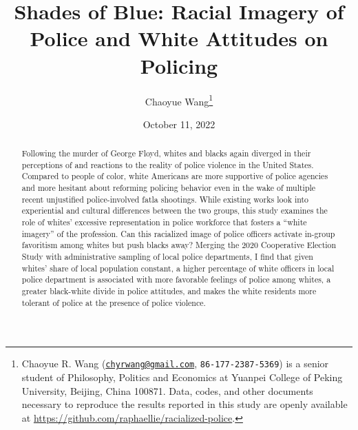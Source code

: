 \documentclass[
  12pt,
]{article}
\title{Shades of Blue: Racial Imagery of Police and White Attitudes on
Policing}
\author{Chaoyue Wang\footnote{Chaoyue R. Wang
  (\href{mailto:chyrwang@gmail.com}{\nolinkurl{chyrwang@gmail.com}},
  \texttt{86-177-2387-5369}) is a senior student of Philosophy, Politics
  and Economics at Yuanpei College of Peking University, Beijing, China
  100871. Data, codes, and other documents necessary to reproduce the
  results reported in this study are openly available at
  \url{https://github.com/raphaellie/racialized-police}.}}
\date{October 11, 2022}
\begin{document}

\maketitle


\thispagestyle{empty}

\begin{abstract}  \onehalfspacing
\begin{normalsize}  \noindent 
Following the murder of George Floyd, whites and blacks again diverged
in their perceptions of and reactions to the reality of police violence
in the United States. Compared to people of color, white Americans are
more supportive of police agencies and more hesitant about reforming
policing behavior even in the wake of multiple recent unjustified
police-involved fatla shootings. While existing works look into
experiential and cultural differences between the two groups, this study
examines the role of whites' excessive representation in police
workforce that fosters a ``white imagery'' of the profession. Can this
racialized image of police officers activate in-group favoritism among
whites but push blacks away? Merging the 2020 Cooperative Election Study
with administrative sampling of local police departments, I find that
given whites' share of local population constant, a higher percentage of
white officers in local police department is associated with more
favorable feelings of police among whites, a greater black-white divide
in police attitudes, and makes the white residents more tolerant of
police at the presence of police violence.
\end{normalsize}
\end{abstract}

\begin{quote}
\end{quote}

\newpage \clearpage {}\captionsetup{labelfont = bf, font = small}



\end{document}
